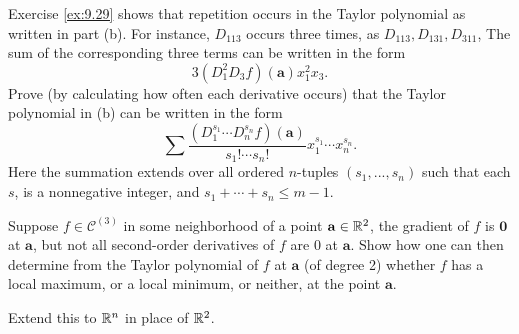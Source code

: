 \begin{myExercise}
\begin{asparaenum}[(a)]
        \item Exercise \ref{ex:9.29} shows that repetition occurs in the Taylor polynomial as written in part (b). 
        For instance, $D_{113}$ occurs three times, as $D_{113}, D_{131}, D_{311}$, 
        The sum of the corresponding three terms can be written in the form
        \begin{equation*}
            3\left( D_1^2 D_3 f \right)(\mathbf{a}) x_1^2 x_3 .
        \end{equation*}
        Prove (by calculating how often each derivative occurs) that the Taylor polynomial in (b) can be written in the form
        \begin{equation*}
            \sum \frac{(D_1^{s_1} \cdots D_n^{s_n} f)(\mathbf{a})}{s_1 ! \cdots s_n !} 
            x_1^{s_1} \cdots x_n^{s_n} .
        \end{equation*}
        Here the summation extends over all ordered $n$-tuples $(s_1, ... , s_n)$ such that each $s$, is a nonnegative integer, and $s_1 + \cdots + s_n \leq m - 1$.
    \end{asparaenum}
\end{myExercise}


\begin{myExercise}
    \label{ex:9.31}
    Suppose $f \in \mathscr{C}^{(3)}$ in some neighborhood of a point $\mathbf{a} \in {\protect\mathbb R}^2$, the gradient of $f$ is $\mathbf{0}$ at $\mathbf{a}$, but not all second-order derivatives of $f$ are 0 at $\mathbf{a}$. 
    Show how one can then determine from the Taylor polynomial of $f$ at $\mathbf{a}$ (of degree 2) whether $f$ has a local maximum, or a local minimum, or neither, at the point $\mathbf{a}$. 
    
    Extend this to ${\protect\mathbb R}^n$ in place of ${\protect\mathbb R}^2$.
\end{myExercise}